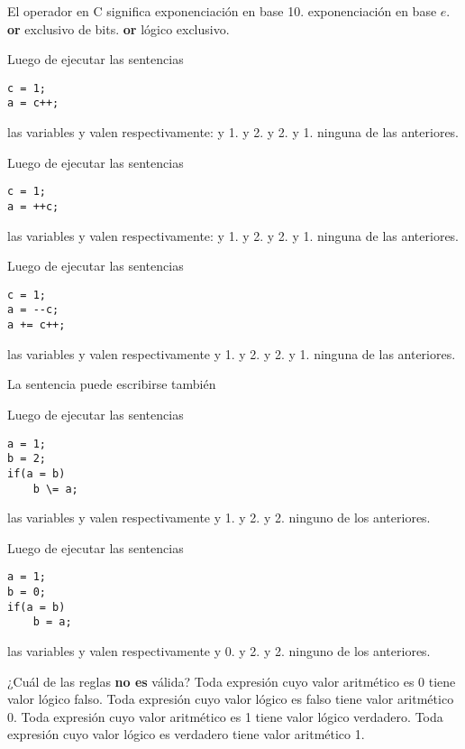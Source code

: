 
\question El operador \code{^} en C significa
\choice exponenciación en base 10.
\choice exponenciación en base $e$.
\correctchoice \textbf{or} exclusivo de bits.
\choice \textbf{or} lógico exclusivo.

\question Luego de ejecutar las sentencias 
\begin{lstlisting}
c = 1; 
a = c++;	
\end{lstlisting}
las variables  y  valen respectivamente:
 y 1.
 y 2.
 y 2.
 y 1.
\choice ninguna de las anteriores.

\question Luego de ejecutar las sentencias 
\begin{lstlisting}
c = 1; 
a = ++c;
\end{lstlisting}
las variables  y  valen respectivamente:
 y 1.
 y 2.
 y 2.
 y 1.
\choice ninguna de las anteriores.

\question Luego de ejecutar las sentencias 
\begin{lstlisting}
c = 1; 
a = --c; 
a += c++;
\end{lstlisting}
las variables  y  valen respectivamente
 y 1.
 y 2.
 y 2.
 y 1.
\correctchoice ninguna de las anteriores.

\question La sentencia  puede escribirse también
\choice {}
\correctchoice {}
\choice {}
\choice {}

\question Luego de ejecutar las sentencias 
\begin{lstlisting}
a = 1; 
b = 2; 
if(a = b) 
	b \= a;	
\end{lstlisting}
las variables  y  valen respectivamente 
 y 1.
 y 2.
 y 2.
\choice ninguno de los anteriores.

\question Luego de ejecutar las sentencias 
\begin{lstlisting}
a = 1; 
b = 0; 
if(a = b) 
	b = a;
\end{lstlisting}
las variables  y  valen respectivamente 
 y 0.
 y 2.
 y 2.
\choice ninguno de los anteriores.

\question ¿Cuál de las reglas \textbf{no es} válida?
\choice Toda expresión cuyo valor aritmético es 0 tiene valor lógico falso.
\choice Toda expresión cuyo valor lógico es falso tiene valor aritmético 0.
\choice Toda expresión cuyo valor aritmético es 1 tiene valor lógico verdadero.
\correctchoice Toda expresión cuyo valor lógico es verdadero tiene valor aritmético 1.

